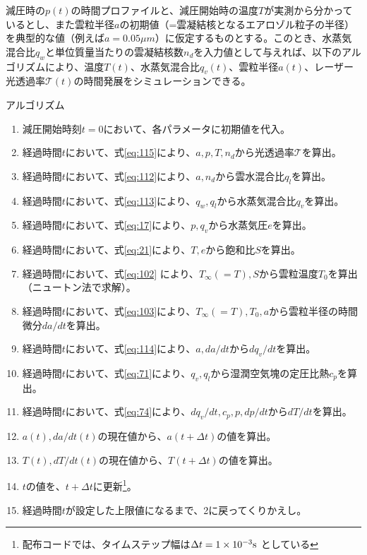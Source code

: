 \documentclass{ltjsarticle}
\begin{document}
減圧時の$p(t)$の時間プロファイルと、減圧開始時の温度$T$が実測から分かっているとし、また雲粒半径$a$の初期値（=雲凝結核となるエアロゾル粒子の半径）を典型的な値（例えば$a=0.05 \mu m$）に仮定するものとする。このとき、水蒸気混合比$q_{w}$と単位質量当たりの雲凝結核数$n_{d}$を入力値として与えれば、以下のアルゴリズムにより、温度$T(t)$、水蒸気混合比$q_{v}(t)$、雲粒半径$a(t)$、レーザー光透過率$\mathcal{T}(t)$の時間発展をシミュレーションできる。
\\
\begin{itembox}[l]{アルゴリズム}
\begin{enumerate}
\item 減圧開始時刻$t=0$において、各パラメータに初期値を代入。
\item 経過時間$t$において、式\eqref{eq:115}により、$a, p, T, n_{d}$から光透過率$\mathcal{T}$を算出。
\item 経過時間$t$において、式\eqref{eq:112}により、$a, n_{d}$から雲水混合比$q_{l}$を算出。
\item 経過時間$t$において、式\eqref{eq:113}により、$q_{w}, q_{l}$から水蒸気混合比$q_{v}$を算出。
\item 経過時間$t$において、式\eqref{eq:17}により、$p, q_{v}$から水蒸気圧$e$を算出。
\item 経過時間$t$において、式\eqref{eq:21}により、$T, e$から飽和比$S$を算出。
\item 経過時間$t$において、式\eqref{eq:102}	により、$T_{\infty}(=T), S$から雲粒温度$T_{0}$を算出 （ニュートン法で求解）。
\item 経過時間$t$において、式\eqref{eq:103}により、$T_{\infty}(=T), T_{0}, a$から雲粒半径の時間微分$da/dt$を算出。
\item 経過時間$t$において、式\eqref{eq:114}により、$a, da/dt$から$dq_{v}/dt$を算出。
\item 経過時間$t$において、式\eqref{eq:71}により、$q_{v}, q_{l}$から湿潤空気塊の定圧比熱$c_{p}$を算出。
\item 経過時間$t$において、式\eqref{eq:74}により、$dq_{v}/dt, c_{p}, p, dp/dt$から$dT/dt$を算出。
\item $a(t), da/dt(t)$の現在値から、$a(t+\Delta t)$の値を算出。
\item $T(t), dT/dt(t)$の現在値から、$T(t+\Delta t)$の値を算出。
\item $t$の値を、$t+\Delta t$に更新\footnote{配布コードでは、タイムステップ幅は$\Delta t=1\times10^{-3}\rm s$ としている}。
\item 経過時間$t$が設定した上限値になるまで、2に戻ってくりかえし。
\end{enumerate}
\end{itembox}
\end{document}
